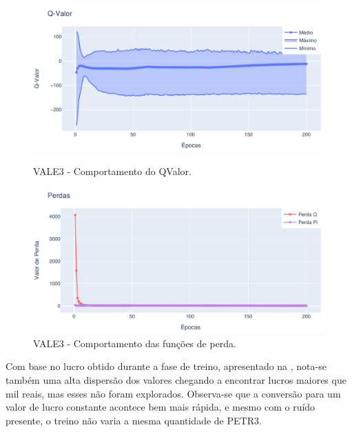 \begin{figure}[htbp]
    \centering 
    \begin{minipage}[b]{0.45\linewidth}
        \includegraphics[width=\linewidth]{img/ddpg/vale3/clean/qval}
        \caption{VALE3 - Comportamento do QValor.} 
        \label{vale_clean_qval}
    \end{minipage}
    \quad
    \begin{minipage}[b]{0.45\linewidth}
        \includegraphics[width=\linewidth]{img/ddpg/vale3/clean/loss}
        \caption{VALE3 - Comportamento das funções de perda.}
        \label{vale_clean_loss}
    \end{minipage}
\end{figure}

Com base no lucro obtido durante a fase de treino, apresentado na , nota-se também uma alta dispersão dos valores chegando a encontrar lucros maiores que mil reais, mas esses não foram explorados. Observa-se que a conversão para um valor de lucro constante acontece bem mais rápida, e mesmo com o ruído presente, o treino não varia a mesma quantidade de PETR3.


